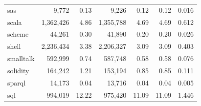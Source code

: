 \documentclass[10pt]{article} %
\begin{document}
\begin{table}[t]
{\begin{tabular}{@{\extracolsep{3pt}}lrrrrrr@{}}
sas                      & 9,772                                     & 0.13                                   & 9,226                                                  & 0.12                                                & 0.12                       & 0.016                          \\
scala                    & 1,362,426                                 & 4.86                                   & 1,355,788                                              & 4.69                                                & 4.69                       & 0.612                          \\
scheme                   & 44,261                                    & 0.30                                   & 41,890                                                 & 0.20                                                & 0.20                       & 0.026                          \\
shell                    & 2,236,434                                 & 3.38                                   & 2,206,327                                              & 3.09                                                & 3.09                       & 0.403                          \\
smalltalk                & 592,999                                   & 0.74                                   & 587,748                                                & 0.58                                                & 0.58                       & 0.076                          \\
solidity                 & 164,242                                   & 1.21                                   & 153,194                                                & 0.85                                                & 0.85                       & 0.111                          \\
sparql                   & 14,173                                    & 0.04                                   & 13,716                                                 & 0.04                                                & 0.04                       & 0.005                          \\
sql                      & 994,019                                   & 12.22                                  & 975,420                                                & 11.09                                               & 11.09                      & 1.446                          \\

\end{tabular}}
\end{table}
\end{document}
